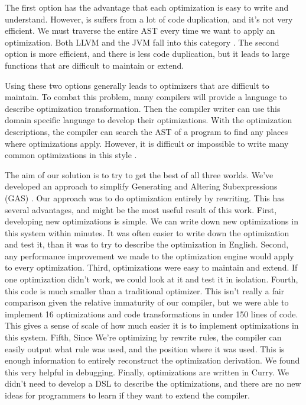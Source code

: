 \documentclass{book}
\theoremstyle{definition}
\begin{document}
The first option has the advantage that each optimization is easy to write and understand.
However, is suffers from a lot of code duplication,
and it's not very efficient.  We must traverse the entire AST every time we want to apply an optimization.
Both LLVM and the JVM fall into this category \cite{llvm, jvm}.
The second option is more efficient, and there is less code duplication,
but it leads to large functions that are difficult to maintain or extend.

Using these two options generally leads to optimizers that are difficult to maintain.
To combat this problem, many compilers will provide a language to describe optimization transformation.
Then the compiler writer can use this domain specific language to develop their optimizations.
With the optimization descriptions, the compiler can search the AST of a program to find
any places where optimizations apply.
However, it is difficult or impossible to write many common optimizations in this style \cite{playingByTheRules}.

The aim of our solution is to try to get the best of all three worlds.
We've developed an approach to simplify Generating and Altering Subexpressions (GAS)
.
Our approach was to do optimization entirely by rewriting.
This has several advantages, and might be the most useful result of this work.
First, developing new optimizations is simple.
We can write down new optimizations in this system within minutes.
It was often easier to write down the optimization and test it,
than it was to try to describe the optimization in English.
Second, any performance improvement we made to the optimization engine
would apply to every optimization.
Third, optimizations were easy to maintain and extend.
If one optimization didn't work, we could look at it and test it in isolation.
Fourth, this code is much smaller than a traditional optimizer.
This isn't really a fair comparison given the relative immaturity of our compiler,
but we were able to implement 16 optimizations and code transformations in under 150 lines of code.
This gives a sense of scale of how much easier it is to implement optimizations in this system.
Fifth, Since We're optimizing by rewrite rules,
the compiler can easily output what rule was used,
and the position where it was used.
This is enough information to entirely reconstruct the optimization derivation.
We found this very helpful in debugging.
Finally, optimizations are written in Curry.
We didn't need to develop a DSL to describe the optimizations,
and there are no new ideas for programmers to learn if they want to extend the compiler.
\end{document}
